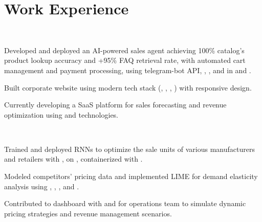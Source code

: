 \documentclass[]{tex/deedy-resume-openfont}
\begin{document}
\hfill
\begin{minipage}[t]{0.66\textwidth} 


\section{Work Experience}
\\
\vspace{\topsep}
\begin{tightemize}
    \item Developed and deployed an AI-powered sales agent achieving 100\% catalog's product lookup accuracy and +95\% FAQ retrieval rate, with automated cart management and payment processing, using telegram-bot API,  , , and  in  and .
    \item Built corporate website using modern tech stack (, , , ) with responsive design.
    \item Currently developing a SaaS platform for sales forecasting and revenue optimization using  and  technologies.
\end{tightemize}
\sectionsep

\\
\begin{tightemize}
    \item Trained and deployed RNNs to optimize the sale units of various manufacturers and retailers with ,  on , containerized with . 
    \item Modeled competitors' pricing data and implemented LIME for demand elasticity analysis using , , , and .
    \item Contributed to dashboard with  and  for operations team to simulate dynamic pricing strategies and revenue management scenarios.
\end{tightemize}
\sectionsep


\end{minipage}
\end{document}
